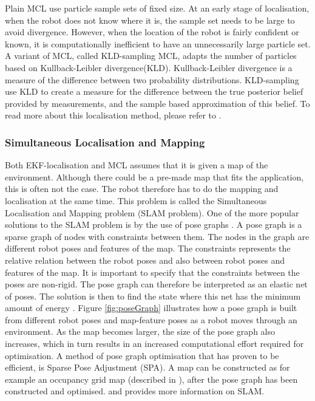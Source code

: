 Plain MCL use particle sample sets of fixed size. At an early stage of localisation, when the robot does not know where it is, the sample set needs to be large to avoid divergence. However, when the location of the robot is fairly confident or known, it is computationally inefficient to have an unnecessarily large particle set. A variant of MCL, called KLD-sampling MCL, adapts the number of particles based on Kullback-Leibler divergence(KLD). Kullback-Leibler divergence is a measure of the difference between two probability distributions. KLD-sampling use KLD to create a measure for the difference between the true posterior belief provided by measurements, and the sample based approximation of this belief. To read more about this localisation method, please refer to \cite{ThrunSebastian2005Pr}.

\subsubsection{Simultaneous Localisation and Mapping} \label{sec:T:AN:L:SLAM}
Both EKF-localisation and MCL assumes that it is given a map of the environment. Although there could be a pre-made map that fits the application, this is often not the case. The robot therefore has to do the mapping and localisation at the same time. This problem is called the Simultaneous Localisation and Mapping problem (SLAM problem). One of the more popular solutions to the SLAM problem is by the use of pose graphs \cite{Konolige2010}. A pose graph is a sparse graph of nodes with constraints between them. The nodes in the graph are different robot poses and features of the map. The constraints represents the relative relation between the robot poses and also between robot poses and features of the map. It is important to specify that the constraints between the poses are non-rigid. The pose graph can therefore be interpreted as an elastic net of poses. The solution is then to find the state where this net has the minimum amount of energy \cite{SiegwartRoland2011Itam}. Figure \ref{fig:poseGraph} illustrates how a pose graph is built from different robot poses and map-feature poses as a robot moves through an environment. As the map becomes larger, the size of the pose graph also increases, which in turn results in an increased computational effort required for optimisation. A method of pose graph optimisation that has proven to be efficient, is Sparse Pose Adjustment (SPA)\cite{Konolige2010}. A  map can be constructed as for example an occupancy grid map (described in \cite{ThrunSebastian2005Pr}), after the pose graph has been constructed and optimised. \cite{SiegwartRoland2011Itam} and \cite{ThrunSebastian2005Pr} provides more information on SLAM.

